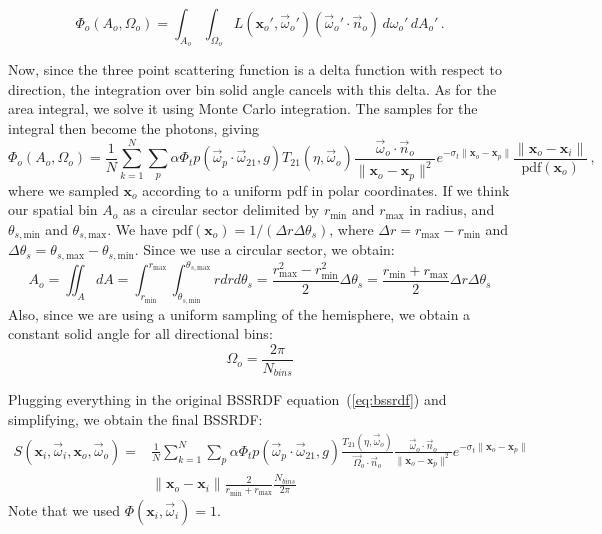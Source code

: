 \documentclass[10pt,a4paper]{article}
\newcommand{\x}{\mathbf{x}}
\newcommand{\vomega}{\vec{\omega}}
\begin{document}
\[
\Phi_o(A_o, \Omega_o) = \int_{A_o} \int_{\Omega_o} L(\x_o', \vomega_o') (\vomega_o' \cdot \vec{n}_o) \, d\omega_o' \, dA_o' \, .
\]

Now, since the three point scattering function is a delta function with respect to direction, the integration over bin solid angle cancels with this delta. As for the area integral, we solve it using Monte Carlo integration. The samples for the integral then become the photons, giving
%
\[
\Phi_o(A_o, \Omega_o) = \frac{1}{N} \sum_{k=1}^N\sum_p \alpha \Phi_t p(\vomega_p \cdot \vomega_{21}, g) T_{21}(\eta, \vomega_o)  \frac{\vomega_o \cdot \vec{n}_o}{\|\x_o - \x_p\|^2}  e^{-\sigma_t \|\x_o - \x_p\|} \frac{\|\x_o - \x_i\|}{\text{pdf}(\x_o)} \, ,
\]
%
where we sampled $\x_o$ according to a uniform pdf in polar coordinates. If we think our spatial bin $A_o$ as a circular sector delimited by $r_\text{min}$ and $r_\text{max}$ in radius, and $\theta_{s,\text{min}}$ and $\theta_{s,\text{max}}$. We have $\text{pdf}(\x_o) = 1/(\Delta r \Delta \theta_{s})$, where $\Delta r =  r_\text{max} - r_\text{min}$ and $\Delta \theta_{s} = \theta_{s,\text{max}} - \theta_{s,\text{min}}$.  Since we use a circular sector, we obtain:
%
\[
A_o = \iint_A dA = \int_{r_\text{min}}^{r_\text{max}}\int_{\theta_{s,\text{min}}}^{\theta_{s,\text{max}}} r dr d\theta_s =  \frac{r_\text{max}^2 - r_\text{min}^2}{2}  \Delta \theta_{s} = \frac{r_\text{min} + r_\text{max}}{2}  \Delta r \Delta \theta_{s}
\]
%
Also, since we are using a uniform sampling of the hemisphere, we obtain a constant solid angle for all directional bins:
%
\begin{equation*}
\Omega_o = \frac{2\pi} {N_{bins}}
\end{equation*}

Plugging everything in the original BSSRDF equation~(\ref{eq:bssrdf}) and simplifying, we obtain the final BSSRDF:
%
\begin{equation*}
\begin{split}
S(\x_i, \vomega_i, \x_o, \vomega_o) = &\frac{1}{N} \sum_{k=1}^N\sum_p \alpha \Phi_t p(\vomega_p \cdot \vomega_{21}, g)  \frac{ T_{21}(\eta, \vomega_o)}{\vec{\Omega}_o \cdot \vec{n}_o}  \frac{\vomega_o\cdot\vec{n}_o}{\|\x_o - \x_p\|^2}  e^{-\sigma_t \|\x_o - \x_p\|} \\& {\|\x_o - \x_i\|} \frac{2}{r_\text{min} + r_\text{max}} \frac{N_{bins}}{2\pi}
\end{split}
\end{equation*}
%
Note that we used $\Phi(\x_i, \vomega_i) = 1$.






\end{document}
